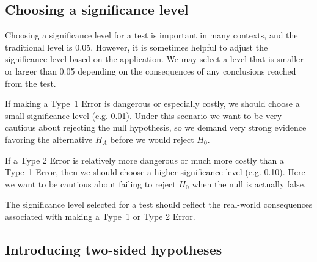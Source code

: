 \subsection{Choosing a significance level}
\label{significanceLevel}


Choosing a significance level for a test is important in many contexts, and the traditional level is 0.05. However, it is sometimes helpful to adjust the significance level based on the application. We may select a level that is smaller or larger than 0.05 depending on the consequences of any conclusions reached from the test.

If making a Type~1 Error is dangerous or especially costly, we should choose a small significance level (e.g. 0.01). Under this scenario we want to be very cautious about rejecting the null hypothesis, so we demand very strong evidence favoring the alternative $H_A$ before we would reject $H_0$.

If a Type 2 Error is relatively more dangerous or much more costly than a Type~1 Error, then we should choose a higher significance level (e.g. 0.10). Here we want to be cautious about failing to reject $H_0$ when the null is actually false.

\begin{tipBox}{
The significance level selected for a test should reflect the real-world consequences associated with making a Type~1 or Type 2 Error.}
\end{tipBox}


\subsection{Introducing two-sided hypotheses}
\label{IntroducingTwoSidedHypotheses}



